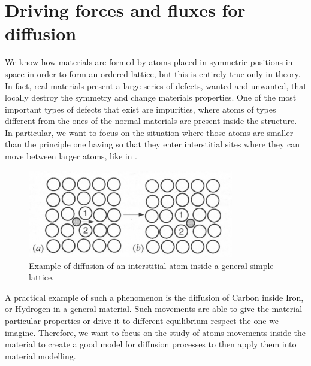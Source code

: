 \section{Driving forces and fluxes for diffusion}

We know how materials are formed by atoms placed in symmetric positions in space in order to form an ordered lattice, but this is entirely true only in theory. In fact, real materials present a large series of defects, wanted and unwanted, that locally destroy the symmetry and change materials properties. One of the most important types of defects that exist are impurities, where atoms of types different from the ones of the normal materials are present inside the structure. In particular, we want to focus on the situation where those atoms are smaller than the principle one having so that they enter interstitial sites where they can move between larger atoms, like in .
\begin{figure}[b]
    \centering
    \includegraphics[width=0.8\textwidth]{Immagini/Inter.png}
    \caption
    {
        Example of diffusion of an interstitial atom inside a general simple lattice.
    }
    \label{fig:Inter}
\end{figure}
A practical example of such a phenomenon is the diffusion of Carbon inside Iron, or Hydrogen in a general material. Such movements are able to give the material particular properties or drive it to different equilibrium respect the one we imagine. Therefore, we want to focus on the study of atoms movements inside the material to create a good model for diffusion processes to then apply them into material modelling.

